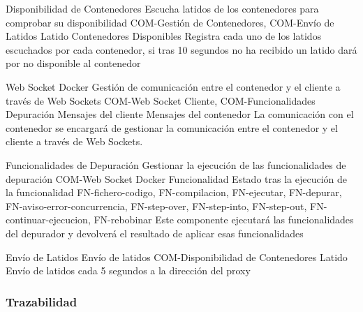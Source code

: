 \begin{component}{Disponibilidad de Contenedores}
{Escucha latidos de los contenedores para comprobar su disponibilidad }
{COM-Gestión de Contenedores, COM-Envío de Latidos} %
{Latido} %
{Contenedores Disponibles} %
{} %
Registra cada uno de los latidos escuchados por cada contenedor, si tras 10 segundos no ha recibido un latido dará por no disponible al contenedor %
\end{component}


\begin{component}{Web Socket Docker}
{Gestión de comunicación entre el contenedor y el cliente a través de Web Sockets}
{COM-Web Socket Cliente, COM-Funcionalidades Depuración} %
{Mensajes del cliente} %
{Mensajes del contenedor} %
{} %
La comunicación con el contenedor se encargará de gestionar la comunicación entre el contenedor y el cliente a través de Web Sockets. %
\end{component}

\begin{component}{Funcionalidades de Depuración}
{Gestionar la ejecución de las funcionalidades de depuración}
{COM-Web Socket Docker} %
{Funcionalidad} %
{Estado tras la ejecución de la funcionalidad} %
{FN-fichero-codigo, FN-compilacion, FN-ejecutar, FN-depurar, FN-aviso-error-concurrencia, FN-step-over, FN-step-into, FN-step-out, FN-continuar-ejecucion, FN-rebobinar} %
Este componente ejecutará las funcionalidades del depurador y devolverá el resultado de aplicar esas funcionalidades %
\end{component}

\begin{component}{Envío de Latidos}
{Envío de latidos}
{COM-Disponibilidad de Contenedores} %
{Latido} %
{} %
{} %
Envío de latidos cada 5 segundos a la dirección del proxy
\end{component}


\FloatBarrier

\subsubsection{Trazabilidad} {\label{subsubsec:trazabilidad-comp}}

\traceabilityCompFN

